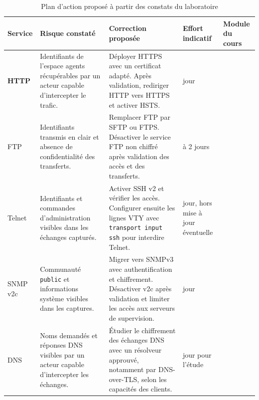\documentclass[11pt,a4paper]{article}
\renewcommand{\arraystretch}{1.25}
\begin{document}
	\begin{table}[H]
		\centering
		\small
		\renewcommand{\arraystretch}{1.2}
		\begin{tabularx}{\linewidth}{
				>{\raggedright\arraybackslash\bfseries}p{1.3cm}
				>{\raggedright\arraybackslash}X
				>{\raggedright\arraybackslash}X
				>{\raggedright\arraybackslash}p{1.8cm}
				>{\raggedright\arraybackslash}p{1.8cm}
			}
			\toprule
			Service &
			Risque constaté &
			Correction proposée &
			Effort indicatif &
			Module du cours \\
			\midrule
			
			HTTP &
			Identifiants de l'espace agents récupérables
			par un acteur capable d'intercepter le trafic. &
			Déployer HTTPS avec un certificat adapté.
			Après validation, rediriger HTTP vers HTTPS
			et activer HSTS. &
			1 jour &
			 \\
			
			\midrule
			
			FTP &
			Identifiants transmis en clair et absence
			de confidentialité des transferts. &
			Remplacer FTP par SFTP ou FTPS.
			Désactiver le service FTP non chiffré
			après validation des accès et des transferts. &
			1 à 2 jours &
			 \\
			
			\midrule
			
			Telnet &
			Identifiants et commandes d'administration
			visibles dans les échanges capturés. &
			Activer SSH v2 et vérifier les accès.
			Configurer ensuite les lignes VTY avec
			\texttt{transport input ssh} pour interdire Telnet. &
			1 jour,
			hors mise à jour éventuelle &
			 \\
			
			\midrule
			
			SNMP v2c &
			Communauté \texttt{public} et informations
			système visibles dans les captures. &
			Migrer vers SNMPv3 avec authentification
			et chiffrement. Désactiver v2c après validation
			et limiter les accès aux serveurs de supervision. &
			1 jour &
			 \\
			
			\midrule
			
			DNS &
			Noms demandés et réponses DNS visibles
			par un acteur capable d'intercepter les échanges. &
			Étudier le chiffrement des échanges DNS
			avec un résolveur approuvé, notamment
			par DNS-over-TLS, selon les capacités des clients. &
			1 jour
			pour l'étude &
			 \\
			
			\bottomrule
		\end{tabularx}
		
		\caption{Plan d'action proposé à partir des constats du laboratoire}
		\label{tab:plan-action}
		
	\end{table}
\end{document}
